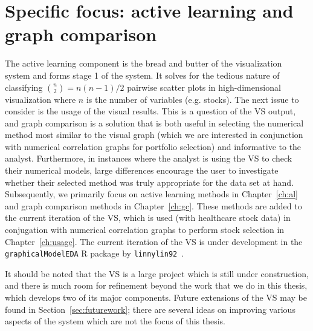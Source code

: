 \section{Specific focus: active learning and graph comparison}
\label{sec:visualizer:focus}

The active learning component is the bread and butter of the visualization 
system and forms stage 1 of the system. It solves for the 
tedious nature of classifying ${n \choose 2}=n(n-1)/2$ pairwise scatter plots 
in high-dimensional visualization where $n$ is the number of variables (e.g. 
stocks). 
The next issue to consider is the usage of the visual results. This is a 
question of the VS output, and graph comparison is a solution
that is both useful in selecting the numerical method most similar to the 
visual graph (which we are interested in conjunction with numerical correlation 
graphs for portfolio selection) and informative to the analyst. Furthermore, in 
instances where the analyst is using the VS to check their numerical models, 
large differences encourage the user to investigate whether their selected 
method was truly appropriate for the data set at hand. 
Subsequently, 
we primarily focus on active learning methods in Chapter~\ref{ch:al} and graph 
comparison methods in Chapter~\ref{ch:gc}. These methods are added to the 
current iteration of the VS, which is used (with healthcare stock data) 
in conjugation with numerical correlation graphs to perform stock selection in 
Chapter~\ref{ch:usage}. The current iteration of the VS is under development in 
the \texttt{graphicalModelEDA} R package by \texttt{linnylin92}~\cite{lin2017}.

It should be noted that the VS is a large project which is still under 
construction, and there is much room for 
refinement beyond the work that we do in this thesis, which develops two of its 
major components. Future extensions of the VS may be found in 
Section~\ref{sec:futurework}; there are several ideas on improving various 
aspects of the system which are not the focus of this thesis.